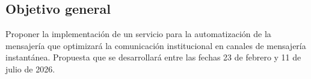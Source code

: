 \subsection{Objetivo general}
Proponer la implementación de un servicio para la automatización de la mensajería que optimizará la comunicación institucional en canales de mensajería instantánea. Propuesta que se desarrollará entre las fechas 23 de febrero y 11 de julio de 2026.

